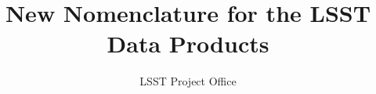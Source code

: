 \documentclass[SE]{lsstdoc}
\title[Dat product categories  ]{New Nomenclature for the LSST Data Products}
\author   {LSST Project Office}
\begin{document}
%
%
\maketitle

\renewcommand{\thepage}{\arabic{page}}%

\setcounter{page}{1}%
%
%


%

\end{document}
